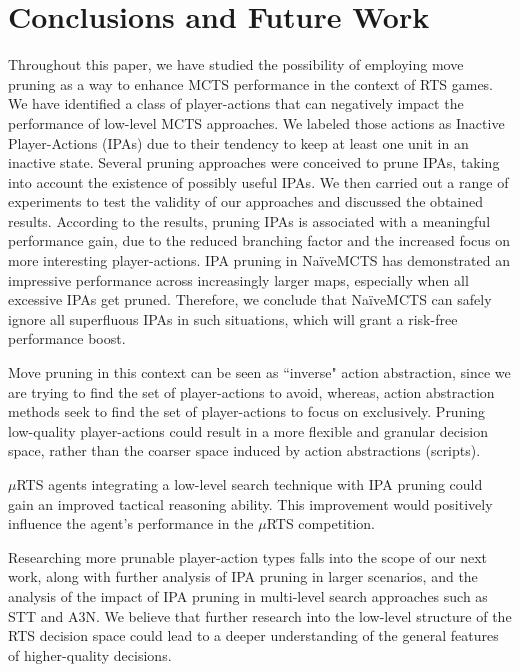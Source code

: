 \documentclass[conference]{IEEEtran}
\newcommand{\mRTS}{$\mu$RTS}
\newcommand{\squeezeup}{\vspace{-2.0mm}}
\begin{document}
\section{Conclusions and Future Work}
\label{sec:conclusions}

Throughout this paper, we have studied the possibility of employing move pruning as a way to enhance MCTS performance in the context of RTS games. We have identified a class of player-actions that can negatively impact the performance of low-level MCTS approaches. We labeled those actions as Inactive Player-Actions (IPAs) due to their tendency to keep at least one unit in an inactive state. Several pruning approaches were conceived to prune IPAs, taking into account the existence of possibly useful IPAs. We then carried out a range of experiments to test the validity of our approaches and discussed the obtained results. According to the results, pruning IPAs is associated with a meaningful performance gain, due to the reduced branching factor and the increased focus on more interesting player-actions. IPA pruning in NaïveMCTS has demonstrated an impressive performance across increasingly larger maps, especially when all excessive IPAs get pruned. Therefore, we conclude that NaïveMCTS can safely ignore all superfluous IPAs in such situations, which will grant a risk-free performance boost.

Move pruning in this context can be seen as ``inverse" action abstraction, since we are trying to find the set of player-actions to avoid, whereas, action abstraction methods seek to find the set of player-actions to focus on exclusively. Pruning low-quality player-actions could result in a more flexible and granular decision space, rather than the coarser space induced by action abstractions (scripts). 

\mRTS{} agents integrating a low-level search technique with IPA pruning could gain an improved tactical reasoning ability. This improvement would positively influence the agent's performance in the \mRTS{} competition.

Researching more prunable player-action types falls into the scope of our next work, along with further analysis of IPA pruning in larger scenarios, and the analysis of the impact of IPA pruning in multi-level search approaches such as STT\cite{barriga_combining_2017} and A3N\cite{moraes_action_2018}. We believe that further research into the low-level structure of the RTS decision space could lead to a deeper understanding of the general features of higher-quality decisions.

\squeezeup


\end{document}
